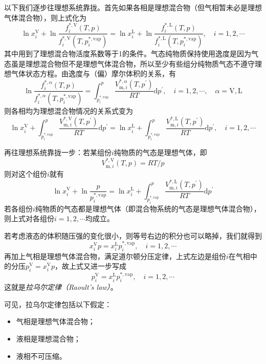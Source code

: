 \documentclass[main.tex]{subfiles}
\begin{document}
以下我们逐步往理想系统靠拢。首先如果各相是理想混合物（但气相暂未必是理想气体混合物），则上式化为
\[\ln x_i^\text{V}+\ln\frac{f_i^{*,\text{V}}\left(T,p\right)}{f_i^{*,\text{V}}\left(T,p_i^{*,\text{vap}}\right)}=\ln x_i^\text{L}+\ln\frac{f_i^{*,\text{L}}\left(T,p\right)}{f_i^{*,\text{L}}\left(T,p_i^{*,\text{vap}}\right)},\quad i=1,2,\cdots\]
其中用到了理想混合物活度系数等于1的条件。气态纯物质保持使用逸度是因为气态虽是理想混合物但不是理想气体混合物，所以至少有些组分纯物质气态不遵守理想气体状态方程。由逸度与（偏）摩尔体积的关系，有
\[\ln\frac{f_i^{*,\alpha}\left(T,p\right)}{f_i^{*,\alpha}\left(T,p_i^{*,\text{vap}}\right)}=\int_{p_i^{*,\text{vap}}}^p\frac{V_{\text{m},i}^{*,\alpha}\left(T,p^\prime\right)}{RT}\mathrm{d}p^\prime,\quad i=1,2,\cdots,\quad \alpha=\text{V},\text{L}\]
则各相均为理想混合物情况的关系式变为
\[\ln x_i^\text{V}+\int_{p_i^{*,\text{vap}}}^{p}\frac{V_{\text{m},i}^{*,\text{V}}\left(T,p^\prime\right)}{RT}\mathrm{d}p^\prime=\ln x_i^\text{L}+\int_{p_i^{*,\text{vap}}}^{p}\frac{V_{\text{m},i}^{*,\text{L}}\left(T,p^\prime\right)}{RT}\mathrm{d}p^\prime,\quad i=1,2,\cdots\]

再往理想系统靠拢一步：若某组份$i$纯物质的气态是理想气体，即
\[V_{\text{m},i}^{*,\text{V}}\left(T,p\right)=RT/p\]
则对这个组份$i$就有
\[\ln x_i^\text{V}+\ln\frac{p}{p_i^{*,\text{vap}}}=\ln x_i^\text{L}+\int_{p_i^{*,\text{vap}}}^{p}\frac{V_{\text{m},i}^{*,\text{L}}\left(T,p^\prime\right)}{RT}\mathrm{d}p^\prime \]
若各组份$i$纯物质的气态都是理想气体（即混合物系统的气态是理想气体混合物），则上式对各组份$i=1,2,\cdots$均成立。

若考虑液态的体积随压强的变化很小，则等号右边的积分也可以略掉，我们就得到
\[x_i^\text{V}p=x_i^\text{L}p_i^{*,\text{vap}},\quad i=1,2,\cdots\]
再加上气相是理想气体混合物，满足道尔顿分压定律，上式左边是组份$i$在气相中的分压$p^\text{V}_i=x_i^\text{V}p$，故上式又进一步写成
\[p_i^\text{V}=x_i^\text{L}p_i^{*,\text{vap}},\quad i=1,2,\cdots\]
这就是\emph{拉乌尔定律（Raoult's law）}。

可见，拉乌尔定律包括以下假定：
\begin{itemize}
  \item 气相是理想气体混合物；
  \item 液相是理想混合物；
  \item 液相不可压缩。
\end{itemize}
\end{document}
